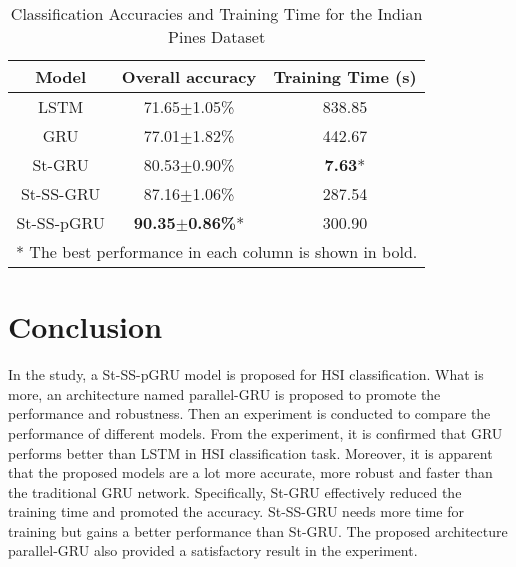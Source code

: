\documentclass[conference]{IEEEtran}
\begin{document}
    \begin{table}[htbp]
    \caption{Classification Accuracies and Training Time for the Indian Pines Dataset}
    \begin{center}
    \begin{tabular}{c|cc}
    \hline
    \hline
    \textbf{Model} & \textbf{Overall accuracy} & \textbf{Training Time (s)}    \\
    \hline
    LSTM           & 71.65$\pm$1.05\%               & 838.85                   \\
    GRU            & 77.01$\pm$1.82\%               & 442.67                   \\
    St-GRU         & 80.53$\pm$0.90\%               & \textbf{7.63}*           \\
    St-SS-GRU      & 87.16$\pm$1.06\%               & 287.54                   \\
    St-SS-pGRU     & \textbf{90.35$\pm$0.86\%}*     & 300.90                   \\
    \hline
    \hline
    \multicolumn{3}{l}{* The best performance in each column is shown in bold.}\\
    \end{tabular}
    \end{center}
    \label{tab:ipaac}
    \end{table}



\section{Conclusion }

In the study, a St-SS-pGRU model is proposed for HSI classification. What is more,
an architecture named parallel-GRU is proposed to promote the performance and
robustness. Then an experiment is conducted to compare the performance of different
models. From the experiment, it is confirmed that GRU performs better than LSTM in
HSI classification task. Moreover, it is apparent that the proposed models are a lot
more accurate, more robust and faster than the traditional GRU network. Specifically,
St-GRU effectively reduced the training time and promoted the accuracy. St-SS-GRU
needs more time for training but gains a better performance than St-GRU. The proposed
architecture parallel-GRU also provided a satisfactory result in the experiment.


















\vspace{12pt}
\end{document}
